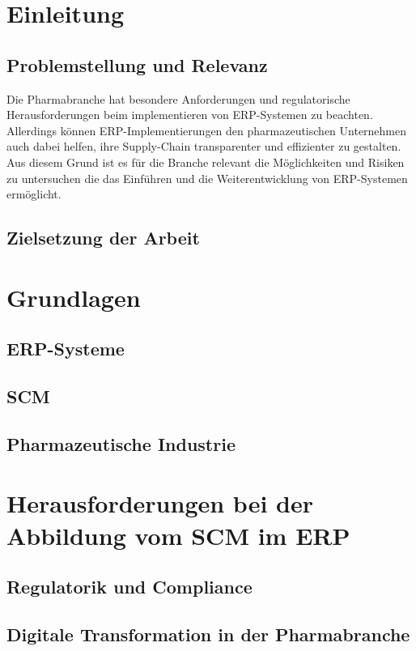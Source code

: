 \documentclass{article}
\begin{document}
\maketitle
\newpage
\tableofcontents
\newpage
\section{Einleitung}
\subsection{Problemstellung und Relevanz}
Die Pharmabranche hat besondere Anforderungen und regulatorische Herausforderungen beim implementieren von ERP-Systemen zu beachten.
Allerdings können ERP-Implementierungen den pharmazeutischen Unternehmen auch dabei helfen, ihre Supply-Chain transparenter und effizienter zu gestalten.
Aus diesem Grund ist es für die Branche relevant die Möglichkeiten und Risiken zu untersuchen die das Einführen und die Weiterentwicklung von ERP-Systemen ermöglicht. \cite{Gronau}
\subsection{Zielsetzung der Arbeit}
\section{Grundlagen}
\subsection{ERP-Systeme}
\subsection{SCM}
\subsection{Pharmazeutische Industrie}

\section{Herausforderungen bei der Abbildung vom SCM im ERP}
\subsection{Regulatorik und Compliance}
\subsection{Digitale Transformation in der Pharmabranche}
\end{document}
